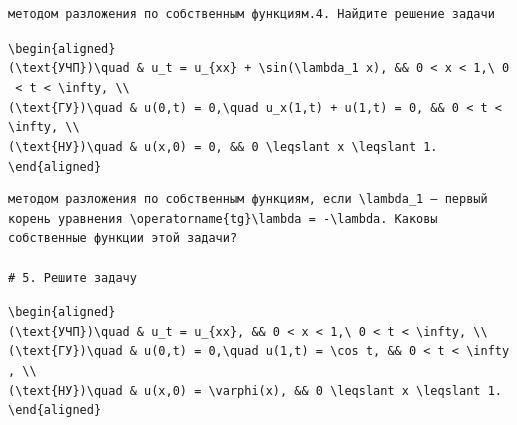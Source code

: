 \documentclass[
  ukrainian,
]{article}
\begin{document}
\begin{verbatim}
методом разложения по собственным функциям.4. Найдите решение задачи
\end{verbatim}

\texttt{\textbackslash{}begin\{aligned\}}
\texttt{(\textbackslash{}text\{УЧП\})\textbackslash{}quad\ \&\ u\_t\ =\ u\_\{xx\}\ +\ \textbackslash{}sin(\textbackslash{}lambda\_1\ x),\ \&\&\ 0\ \textless{}\ x\ \textless{}\ 1,\textbackslash{}\ 0\ \textless{}\ t\ \textless{}\ \textbackslash{}infty,\ \textbackslash{}\textbackslash{}}
\texttt{(\textbackslash{}text\{ГУ\})\textbackslash{}quad\ \&\ u(0,t)\ =\ 0,\textbackslash{}quad\ u\_x(1,t)\ +\ u(1,t)\ =\ 0,\ \&\&\ 0\ \textless{}\ t\ \textless{}\ \textbackslash{}infty,\ \textbackslash{}\textbackslash{}}
\texttt{(\textbackslash{}text\{НУ\})\textbackslash{}quad\ \&\ u(x,0)\ =\ 0,\ \&\&\ 0\ \textbackslash{}leqslant\ x\ \textbackslash{}leqslant\ 1.}
\texttt{\textbackslash{}end\{aligned\}}

\begin{verbatim}
методом разложения по собственным функциям, если \lambda_1 — первый корень уравнения \operatorname{tg}\lambda = -\lambda. Каковы собственные функции этой задачи?

# 5. Решите задачу
\end{verbatim}

\texttt{\textbackslash{}begin\{aligned\}}
\texttt{(\textbackslash{}text\{УЧП\})\textbackslash{}quad\ \&\ u\_t\ =\ u\_\{xx\},\ \&\&\ 0\ \textless{}\ x\ \textless{}\ 1,\textbackslash{}\ 0\ \textless{}\ t\ \textless{}\ \textbackslash{}infty,\ \textbackslash{}\textbackslash{}}
\texttt{(\textbackslash{}text\{ГУ\})\textbackslash{}quad\ \&\ u(0,t)\ =\ 0,\textbackslash{}quad\ u(1,t)\ =\ \textbackslash{}cos\ t,\ \&\&\ 0\ \textless{}\ t\ \textless{}\ \textbackslash{}infty,\ \textbackslash{}\textbackslash{}}
\texttt{(\textbackslash{}text\{НУ\})\textbackslash{}quad\ \&\ u(x,0)\ =\ \textbackslash{}varphi(x),\ \&\&\ 0\ \textbackslash{}leqslant\ x\ \textbackslash{}leqslant\ 1.}
\texttt{\textbackslash{}end\{aligned\}}
\end{document}
